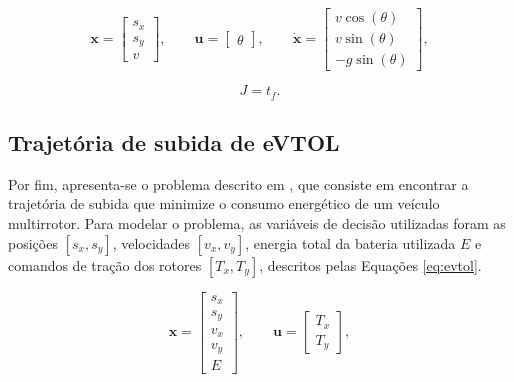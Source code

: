 \begin{equation}
    \mathbf{x} = \begin{bmatrix}
        s_x \\
        s_y \\
        v
    \end{bmatrix},
    \qquad
    \mathbf{u} = \begin{bmatrix}
        \theta
    \end{bmatrix},
    \qquad
    \dot{\mathbf{x}} = \begin{bmatrix}
        v \cos(\theta) \\
        v \sin(\theta) \\
        -g \sin(\theta)
    \end{bmatrix},
    \label{eq:braquistocrona}
\end{equation}

\begin{equation}
    J = t_f.
    \label{eq:braquistocrona-J}
\end{equation}


\subsection{Trajetória de subida de eVTOL}
\label{subsec:evtol}

Por fim, apresenta-se o problema descrito em \cite{costa_otimizacao_2023}, que consiste em encontrar a trajetória de subida que minimize o consumo energético de um veículo multirrotor. Para modelar o problema, as variáveis de decisão utilizadas foram as posições $[s_x, s_y]$, velocidades $[v_x, v_y]$, energia total da bateria utilizada $E$ e comandos de tração dos rotores $[T_x, T_y]$, descritos pelas Equações \ref{eq:evtol}.

\begin{equation}
    \mathbf{x} = \begin{bmatrix}
        s_x \\
        s_y \\
        v_x \\
        v_y \\
        E
    \end{bmatrix},
    \qquad
    \mathbf{u} = \begin{bmatrix}
        T_x \\
        T_y
    \end{bmatrix},
    \label{eq:evtol}
\end{equation}

